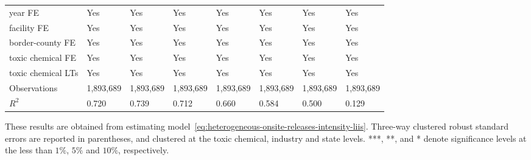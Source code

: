 \begin{table}[H]
{\begin{tabular}{@{}llllllll@{}}
            year FE                               & Yes       & Yes           & Yes       & Yes          & Yes             & Yes           & Yes                 \\
            facility FE                           & Yes       & Yes           & Yes       & Yes          & Yes             & Yes           & Yes                 \\
            border-county FE                      & Yes       & Yes           & Yes       & Yes          & Yes             & Yes           & Yes                 \\
            toxic chemical FE                     & Yes       & Yes           & Yes       & Yes          & Yes             & Yes           & Yes                 \\
            toxic chemical LTs                    & Yes       & Yes           & Yes       & Yes          & Yes             & Yes           & Yes                 \\ \midrule
            Observations                          & 1,893,689 & 1,893,689     & 1,893,689 & 1,893,689    & 1,893,689       & 1,893,689     & 1,893,689           \\
            $R^2$                                 & 0.720     & 0.739         & 0.712     & 0.660        & 0.584           & 0.500         & 0.129               \\ \bottomrule \bottomrule
        \end{tabular}%
    }
    \begin{minipage}{18cm}
        \vspace{0.05in}
        These results are obtained from estimating model~\ref{eq:heterogeneous-onsite-releases-intensity-liis}. Three-way clustered robust standard errors are reported in parentheses, and clustered at the toxic chemical, industry and state levels. ***, **, and * denote significance levels at the less than $1\%$, $5\%$ and $10\%$, respectively.
    \end{minipage}
\end{table}